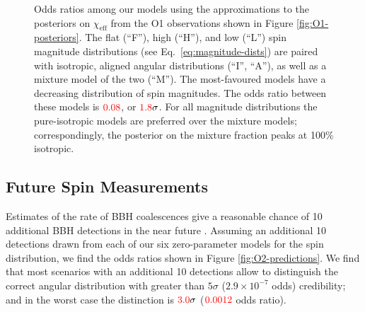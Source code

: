 \documentclass[modern,linenumbers]{aastex61}
\newcommand{\chieff}{\chi_\mathrm{eff}}
\newcommand{\checkme}[1]{\textcolor{red}{#1}}
\newcommand{\OOneSigmaIsoAligned}{\checkme{1.8}}
\newcommand{\OOneOddsIsoAligned}{\checkme{0.08}}
\newcommand{\OTwoSigmaIsoAlignedMin}{\checkme{3.0}}
\newcommand{\OTwoOddsIsoAlignedMin}{\checkme{0.0012}}
\begin{document}
\begin{figure}
  \caption{Odds ratios among our models using the approximations to
    the posteriors on $\chieff$ from the O1 observations shown in
    Figure \ref{fig:O1-posteriors}.  The flat (``F''), high (``H''),
    and low (``L'') spin magnitude distributions (see Eq.\
    \eqref{eq:magnitude-dists}) are paired with isotropic, aligned
    angular distributions (``$\mathrm{I}$'', ``$\mathrm{A}$''), as
    well as a mixture model of the two (``$\mathrm{M}$'').  The
    most-favoured models have a decreasing distribution of spin
    magnitudes.  The odds ratio between these models is
    $\OOneOddsIsoAligned$, or $\OOneSigmaIsoAligned\sigma$.  For all
    magnitude distributions the pure-isotropic models are preferred
    over the mixture models; correspondingly, the posterior on the
    mixture fraction peaks at 100\% isotropic.}
  \label{fig:O1-odds}
\end{figure}

\subsection{Future Spin Measurements}
\label{subsec:future}

Estimates of the rate of \ac{BBH} coalescences give a reasonable
chance of 10 additional \ac{BBH} detections in the near future
\citep{O1-BBH,2016ApJ...833L...1A,2016ApJS..227...14A}.  Assuming an
additional 10 detections drawn from each of our six zero-parameter
models for the spin distribution, we find the odds ratios shown in
Figure \ref{fig:O2-predictions}.  We find that most scenarios with an
additional 10 detections allow to distinguish the correct angular
distribution with greater than $5\sigma$ ($2.9 \times 10^{-7}$ odds)
credibility; and in the worst case the distinction is
$\OTwoSigmaIsoAlignedMin\sigma$ ($\OTwoOddsIsoAlignedMin$ odds ratio).
\end{document}
